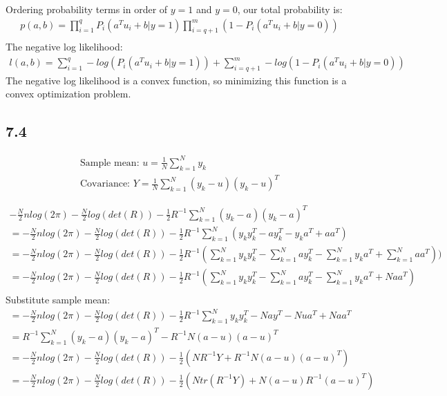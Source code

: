 \documentclass[12pt]{article}
\newenvironment{proposition}[2][Proposition]{\begin{trivlist}
\item[\hskip \labelsep {\bfseries #1}\hskip \labelsep {\bfseries #2.}]}{\end{trivlist}}
\begin{document}
Ordering probability terms in order of $y=1$ and $y=0$, our total probability is:
\begin{equation*}
\begin{aligned}
p(a,b) = \prod_{i=1}^{q}P_i(a^Tu_i+b|y=1)\prod_{i=q+1}^{m}(1-P_i(a^Tu_i+b|y=0))\\
\end{aligned}
\end{equation*}
The negative log likelihood:
\begin{equation*}
\begin{aligned}
l(a,b) = \sum_{i=1}^{q}-log(P_i(a^Tu_i+b|y=1))+\sum_{i=q+1}^{m}-log(1-P_i(a^Tu_i+b|y=0))
\end{aligned}
\end{equation*}
The negative log likelihood is a convex function, so minimizing this function is a convex optimization problem.

\subsection*{7.4}
\begin{proposition}{1}
\begin{align}
\text{Sample mean: }
u = \frac{1}{N}\sum_{k=1}^{N}y_k\\
\text{Covariance: }
Y = \frac{1}{N}\sum_{k=1}^{N}(y_k-u)(y_k-u)^T
\end{align}
\end{proposition}

\begin{equation*}
\begin{aligned}
-\frac{N}{2}nlog(2\pi)-\frac{N}{2}log(det(R))- \frac{1}{2}R^{-1}\sum_{k=1}^{N}(y_k-a)(y_k-a)^T\\
= -\frac{N}{2}nlog(2\pi)-\frac{N}{2}log(det(R))- \frac{1}{2}R^{-1}\sum_{k=1}^{N}(y_ky_k^T-ay_k^T-y_ka^T+aa^T)\\
= -\frac{N}{2}nlog(2\pi)-\frac{N}{2}log(det(R))- \frac{1}{2}R^{-1}(\sum_{k=1}^{N}y_ky_k^T-\sum_{k=1}^{N}ay_k^T-\sum_{k=1}^{N}y_ka^T+\sum_{k=1}^{N}aa^T))\\
= -\frac{N}{2}nlog(2\pi)-\frac{N}{2}log(det(R))- \frac{1}{2}R^{-1}(\sum_{k=1}^{N}y_ky_k^T-\sum_{k=1}^{N}ay_k^T-\sum_{k=1}^{N}y_ka^T+Naa^T)\\
\end{aligned}
\end{equation*}
Substitute sample mean:
\begin{equation*}
\begin{aligned}
= -\frac{N}{2}nlog(2\pi)-\frac{N}{2}log(det(R))- \frac{1}{2}R^{-1}\sum_{k=1}^{N}y_ky_k^T-Nay^T-Nua^T+Naa^T\\
= R^{-1}\sum_{k=1}^{N}(y_k-a)(y_k-a)^T-R^{-1}N(a-u)(a-u)^T\\
= -\frac{N}{2}nlog(2\pi)-\frac{N}{2}log(det(R))- \frac{1}{2}(NR^{-1}Y + R^{-1}N(a-u)(a-u)^T)\\
= -\frac{N}{2}nlog(2\pi)-\frac{N}{2}log(det(R))- \frac{1}{2}(Ntr(R^{-1}Y) + N(a-u)R^{-1}(a-u)^T)
\end{aligned}
\end{equation*}


 
\end{document}
